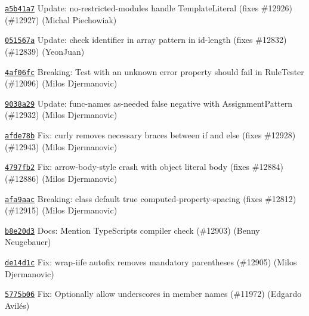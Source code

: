 \begin{DoxyItemize}
\item \href{https://github.com/eslint/eslint/commit/a5b41a75b57572e97476b06ad39b768e15b9d844}{\texttt{ {\ttfamily a5b41a7}}} Update\+: no-\/restricted-\/modules handle Template\+Literal (fixes \#12926) (\#12927) (Michal Piechowiak)
\item \href{https://github.com/eslint/eslint/commit/051567adca7ca56d691bcda76f54ed72e3eae367}{\texttt{ {\ttfamily 051567a}}} Update\+: check identifier in array pattern in id-\/length (fixes \#12832) (\#12839) (Yeon\+Juan)
\item \href{https://github.com/eslint/eslint/commit/4af06fc49029dac5c9acfd53f01fd9527bfbb4aa}{\texttt{ {\ttfamily 4af06fc}}} Breaking\+: Test with an unknown error property should fail in Rule\+Tester (\#12096) (Milos Djermanovic)
\item \href{https://github.com/eslint/eslint/commit/9038a29569548c0563c29dbe9f7dae280ff3addd}{\texttt{ {\ttfamily 9038a29}}} Update\+: func-\/names {\ttfamily as-\/needed} false negative with Assignment\+Pattern (\#12932) (Milos Djermanovic)
\item \href{https://github.com/eslint/eslint/commit/afde78b125747ce5ad9e5f871122a0d370dd0152}{\texttt{ {\ttfamily afde78b}}} Fix\+: curly removes necessary braces between if and else (fixes \#12928) (\#12943) (Milos Djermanovic)
\item \href{https://github.com/eslint/eslint/commit/4797fb2c29db97bc5cd23b40e5a9235fef1ea06a}{\texttt{ {\ttfamily 4797fb2}}} Fix\+: arrow-\/body-\/style crash with object literal body (fixes \#12884) (\#12886) (Milos Djermanovic)
\item \href{https://github.com/eslint/eslint/commit/afa9aac6de9444e935a55b46311e5b5a58f86063}{\texttt{ {\ttfamily afa9aac}}} Breaking\+: class default {\ttfamily true} computed-\/property-\/spacing (fixes \#12812) (\#12915) (Milos Djermanovic)
\item \href{https://github.com/eslint/eslint/commit/b8e20d33b7d6645266beef09cd231afaf5054328}{\texttt{ {\ttfamily b8e20d3}}} Docs\+: Mention Type\+Script\textquotesingle{}s compiler check (\#12903) (Benny Neugebauer)
\item \href{https://github.com/eslint/eslint/commit/de14d1ce0cf422b4100a686abb906f53fbf905b3}{\texttt{ {\ttfamily de14d1c}}} Fix\+: wrap-\/iife autofix removes mandatory parentheses (\#12905) (Milos Djermanovic)
\item \href{https://github.com/eslint/eslint/commit/5775b06a74573cbe068bea56b1d2376421f5e831}{\texttt{ {\ttfamily 5775b06}}} Fix\+: Optionally allow underscores in member names (\#11972) (Edgardo Avilés)

\end{DoxyItemize}
